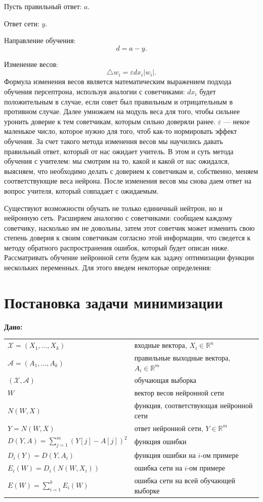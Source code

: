\documentclass[14pt]{extreport}
\begin{document}
    Пусть правильный ответ: $a$.

    Ответ сети: $y$.

    Направление обучения: \[d = a - y.\]

    Изменение весов: \[\triangle w_i = \varepsilon d x_i |w_i|.\]
    Формула изменения весов является математическим выражением подхода обучения персептрона, используя аналогии с советчиками: $d x_i$ будет положительным в случае, если совет был правильным и отрицательным в противном случае. Далее умножаем на модуль веса для того, чтобы сильнее уронить доверие к тем советчикам, которым сильно доверяли ранее. $\varepsilon$ --- некое маленькое число, которое нужно для того, чтоб как-то нормировать эффект обучения. За счет такого метода изменения весов мы научились давать правильный ответ, который от нас ожидает учитель. В этом и суть метода обучения с учителем: мы смотрим на то, какой и какой от нас ожидался, выясняем, что необходимо делать с доверием к советчикам и, собственно, меняем соответствующие веса нейрона. После изменения весов мы снова даем ответ на вопрос учителя, который совпадает с ожидаемым.

    Существуют возможности обучать не только единичный нейтрон, но и нейронную сеть. Расширяем аналогию с советчиками: сообщаем каждому советчику, насколько им не довольны, затем этот советчик может изменить свою степень доверия к своим советчикам согласно этой информации, что сведется к методу обратного распространения ошибок, который будет описан ниже. Рассматривать обучение нейронной сети будем как задачу оптимизации функции нескольких переменных. Для этого введем некоторые определения:
    \section{Постановка задачи минимизации}

        {\bf
            Дано:
        }

        \begin{tabular}{p{6cm} p{7.5cm}}
             $\mathcal{X}=(X_1,\ldots,X_k)$ & входные вектора, $X_i\in\mathbb{R}^n$\\[0.1cm]
             $\mathcal{A}=(A_1,\ldots,A_k)$ & правильные выходные вектора, $A_i\in\mathbb{R}^m$\\[0.1cm]
             $(\mathcal{X},\mathcal{A})$ & обучающая выборка  \\[0.1cm]
             $W$ & вектор весов нейронной сети \\[0.1cm]
             $N(W,X)$ & функция, соответствующая нейронной сети \\[0.1cm]
             $Y=N(W,X)$ & ответ нейронной сети, $Y\in\mathbb{R}^m$ \\[0.1cm]
             $D(Y,A) =\sum_{j=1}^{m} (Y[j]-A[j])^2$ & функция ошибки\\[0.1cm]
             $D_i(Y)=D(Y,A_i) $ & функция ошибки на $i$-ом примере \\[0.1cm]
              $E_i(W)=D_i(N(W,X_i))$ & ошибка сети на $i$-ом примере\\[0.1cm]
              $E(W)=\sum_{i=1}^{k}E_i(W) $ & ошибка сети на всей обучающей выборке \\[0.1cm]
         \end{tabular}
\end{document}
